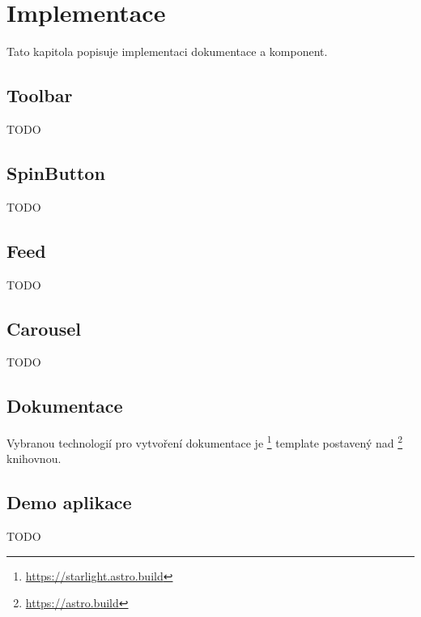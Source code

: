 \chapter{Implementace}

Tato kapitola popisuje implementaci dokumentace a komponent.

\section{Toolbar}

TODO

\section{SpinButton}

TODO

\section{Feed}

TODO

\section{Carousel}

TODO

\section{Dokumentace}

Vybranou technologií pro vytvoření dokumentace je \footnote{\url{https://starlight.astro.build}} template postavený nad \footnote{\url{https://astro.build}} knihovnou.

\section{Demo aplikace}

TODO
